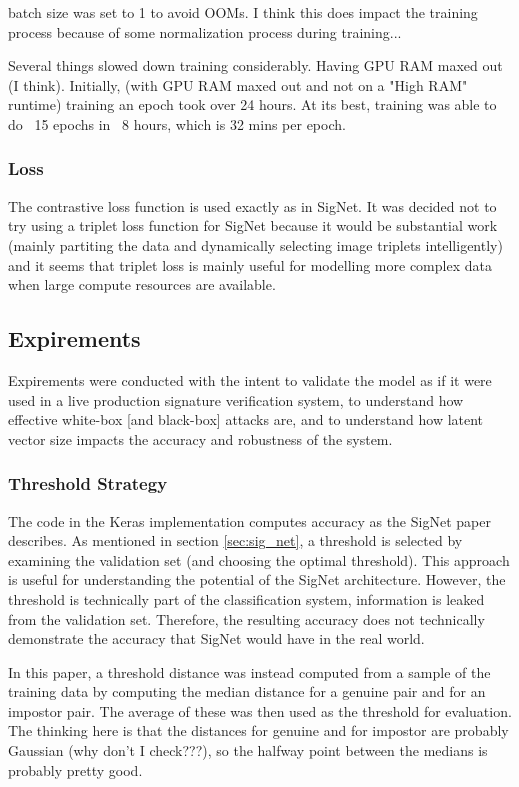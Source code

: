 batch size was set to 1 to avoid OOMs.
I think this does impact the training process because of some normalization process during training...

Several things slowed down training considerably.
Having GPU RAM maxed out (I think).
Initially, (with GPU RAM maxed out and not on a "High RAM" runtime) training an epoch took over 24 hours.
At its best, training was able to do ~15 epochs in ~8 hours, which is 32 mins per epoch.


\subsubsection{Loss}
The contrastive loss function is used exactly as in SigNet\cite{GitHub_sounakdey}.
It was decided not to try using a triplet loss function for SigNet because it would be substantial work (mainly partiting the data and dynamically selecting image triplets intelligently) and it seems that triplet loss is mainly useful for modelling more complex data when large compute resources are available.


\subsection{Expirements}

Expirements were conducted with the intent to validate the model as if it were used in a live production signature verification system, to understand how effective white-box [and black-box] attacks are, and to understand how latent vector size impacts the accuracy and robustness of the system.

\subsubsection{Threshold Strategy}

The code in the Keras implementation computes accuracy as the SigNet paper describes.
As mentioned in section \ref{sec:sig_net}, a threshold is selected by examining the validation set (and choosing the optimal threshold).
This approach is useful for understanding the potential of the SigNet architecture.
However, the threshold is technically part of the classification system, information is leaked from the validation set.
Therefore, the resulting accuracy does not technically demonstrate the accuracy that SigNet would have in the real world.

In this paper, a threshold distance was instead computed from a sample of the training data by computing the median distance for a genuine pair and for an impostor pair.
The average of these was then used as the threshold for evaluation.
The thinking here is that the distances for genuine and for impostor are probably Gaussian (why don't I check???), so the halfway point between the medians is probably pretty good.

